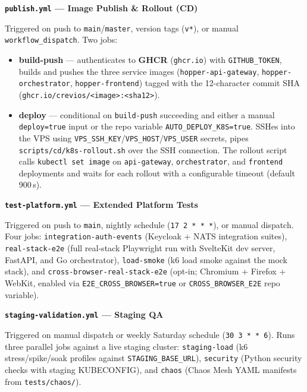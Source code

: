 \documentclass[12pt,a4paper]{article}
\begin{document}
\begin{sloppypar}
\noindent\textbf{\texttt{publish.yml} --- Image Publish \& Rollout (CD)}

Triggered on push to \texttt{main}/\texttt{master}, version tags (\texttt{v*}),
or manual \texttt{workflow\_dispatch}. Two jobs:

\begin{itemize}[leftmargin=1.5em]
  \item \textbf{build-push} --- authenticates to \textbf{GHCR}
        (\texttt{ghcr.io}) with \texttt{GITHUB\_TOKEN}, builds and pushes
        the three service images (\texttt{hopper-api-gateway},
        \texttt{hopper-orchestrator}, \texttt{hopper-frontend}) tagged with
        the 12-character commit SHA (\texttt{ghcr.io/crevios/<image>:<sha12>}).
  \item \textbf{deploy} --- conditional on \texttt{build-push} succeeding
        and either a manual \texttt{deploy=true} input or the repo variable
        \texttt{AUTO\_DEPLOY\_K8S=true}. SSHes into the VPS using
        \texttt{VPS\_SSH\_KEY}/\texttt{VPS\_HOST}/\texttt{VPS\_USER}
        secrets, pipes \texttt{scripts/cd/k8s-rollout.sh} over the SSH
        connection. The rollout script calls \texttt{kubectl set image} on
        \texttt{api-gateway}, \texttt{orchestrator}, and \texttt{frontend}
        deployments and waits for each rollout with a configurable timeout
        (default 900\,s).
\end{itemize}
\end{sloppypar}

\begin{sloppypar}
\medskip
\noindent\textbf{\texttt{test-platform.yml} --- Extended Platform Tests}

Triggered on push to \texttt{main}, nightly schedule (\texttt{17 2 * * *}),
or manual dispatch. Four jobs: \texttt{integration-auth-events} (Keycloak +
NATS integration suites), \texttt{real-stack-e2e} (full real-stack Playwright
run with SvelteKit dev server, FastAPI, and Go orchestrator), \texttt{load-smoke}
(k6 load smoke against the mock stack), and
\texttt{cross-browser-real-stack-e2e} (opt-in; Chromium + Firefox + WebKit,
enabled via \texttt{E2E\_CROSS\_BROWSER=true} or
\texttt{CROSS\_BROWSER\_E2E} repo variable).
\end{sloppypar}

\medskip
\noindent\textbf{\texttt{staging-validation.yml} --- Staging QA}

Triggered on manual dispatch or weekly Saturday schedule
(\texttt{30 3 * * 6}).
Runs three parallel jobs against a live staging cluster:
\texttt{staging-load} (k6 stress/spike/soak profiles against
\texttt{STAGING\_BASE\_URL}), \texttt{security} (Python security checks with
staging KUBECONFIG), and \texttt{chaos} (Chaos Mesh YAML manifests from
\texttt{tests/chaos/}).
\end{document}
